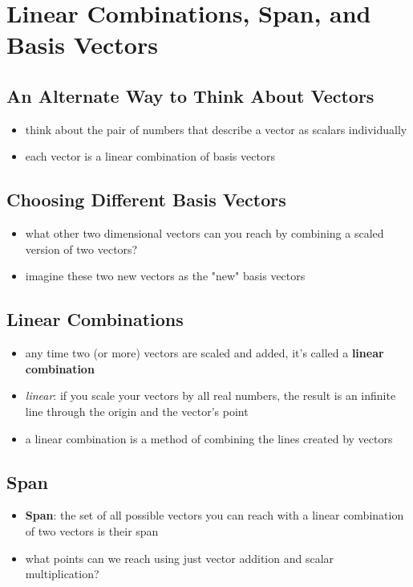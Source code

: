 \section{Linear Combinations, Span, and Basis Vectors}\label{sec:span}
\subsection{An Alternate Way to Think About Vectors}
\begin{itemize}
   \item think about the pair of numbers that describe a vector as scalars individually
   \item each vector is a linear combination of basis vectors
\end{itemize}

\subsection{Choosing Different Basis Vectors}
\begin{itemize}
    \item what other two dimensional vectors can you reach by combining a scaled version of two vectors?
    \item imagine these two new vectors as the "new" basis vectors
\end{itemize}

\subsection{Linear Combinations}
\begin{itemize}
    \item any time two (or more) vectors are scaled and added, it's called a \textbf{linear combination} 
    \item \textit{linear}: if you scale your vectors by all real numbers, the result is an infinite line through the origin and the vector's point
    \item a linear combination is a method of combining the lines created by vectors
\end{itemize}

\subsection{Span}
\begin{itemize}
    \item \textbf{Span}: the set of all possible vectors you can reach with a linear combination of two vectors is their span
    \item what points can we reach using just vector addition and scalar multiplication?
\end{itemize}

